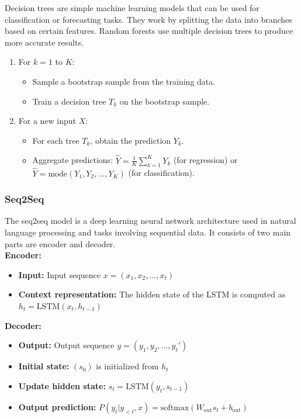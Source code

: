 \documentclass{ieeeojies}
\begin{document}
Decision trees are simple machine learning models that can be used for classification or forecasting tasks. They work by splitting the data into branches based on certain features. Random forests use multiple decision trees to produce more accurate results.
\begin{enumerate}
    \item For \(k = 1\) to \(K\):
    \begin{itemize}
        \item Sample a bootstrap sample from the training data.
        \item Train a decision tree \(T_k\) on the bootstrap sample.
    \end{itemize}
    \item For a new input \(X\):
    \begin{itemize}
        \item For each tree \(T_k\), obtain the prediction \(Y_k\).
        \item Aggregate predictions: \( \hat{Y} = \frac{1}{K} \sum_{k=1}^{K} Y_k \) (for regression) or \( \hat{Y} = \text{mode}(Y_1, Y_2, \ldots, Y_K) \) (for classification).
    \end{itemize}
\end{enumerate}

\subsubsection{\textbf{Seq2Seq}}
\hspace{1em}The seq2seq model is a deep learning neural network architecture used in natural language processing and tasks involving sequential data. It consists of two main parts are encoder and decoder. \\
\textbf{Encoder:}
\begin{itemize}
    \item \textbf{Input:} Input sequence $x = (x_1, x_2, \dots, x_t)$
    \item \textbf{Context representation:} The hidden state of the LSTM is computed as $h_t = \text{LSTM}(x_t, h_{t-1})$
\end{itemize}

\textbf{Decoder:}
\begin{itemize}
    \item \textbf{Output:} Output sequence $y = (y_1, y_2, \dots, y_t')$
    \item \textbf{Initial state:} $(s_0)$ is initialized from $h_t$
    \item \textbf{Update hidden state:} $s_t = \text{LSTM}(y_t, s_{t-1})$
    \item \textbf{Output prediction:} $P(y_t|y_{<t}, x) = \text{softmax}(W_{\text{out}} s_t + b_{\text{out}})$
\end{itemize}
\end{document}
